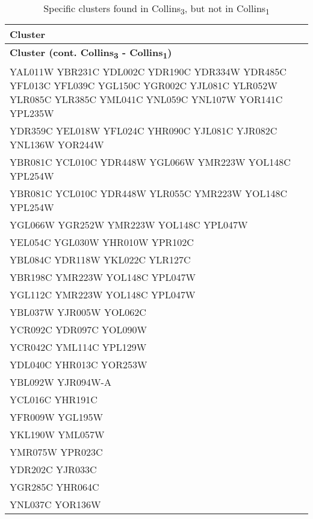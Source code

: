\setlength{\extrarowheight}{2pt}
\renewcommand{\arraystretch}{1.2}
\begin{longtable}{| m{27em} |}
\caption{Specific clusters found in Collins\textsubscript{3}, but not in Collins\textsubscript{1}} \\
\hline
\textbf{Cluster} \\
\hline
\endfirsthead
\hline
\textbf{Cluster (cont. Collins\textsubscript{3} - Collins\textsubscript{1})} \\
\hline
\endhead
\hline
\endfoot
\hline
\endlastfoot
YAL011W YBR231C YDL002C YDR190C YDR334W YDR485C YFL013C YFL039C YGL150C YGR002C YJL081C YLR052W YLR085C YLR385C YML041C YNL059C YNL107W YOR141C YPL235W \\
\hline
YDR359C YEL018W YFL024C YHR090C YJL081C YJR082C YNL136W YOR244W \\
\hline
YBR081C YCL010C YDR448W YGL066W YMR223W YOL148C YPL254W \\
\hline
YBR081C YCL010C YDR448W YLR055C YMR223W YOL148C YPL254W \\
\hline
YGL066W YGR252W YMR223W YOL148C YPL047W \\
\hline
YEL054C YGL030W YHR010W YPR102C \\
\hline
YBL084C YDR118W YKL022C YLR127C \\
\hline
YBR198C YMR223W YOL148C YPL047W \\
\hline
YGL112C YMR223W YOL148C YPL047W \\
\hline
YBL037W YJR005W YOL062C \\
\hline
YCR092C YDR097C YOL090W \\
\hline
YCR042C YML114C YPL129W \\
\hline
YDL040C YHR013C YOR253W \\
\hline
YBL092W YJR094W-A \\
\hline
YCL016C YHR191C \\
\hline
YFR009W YGL195W \\
\hline
YKL190W YML057W \\
\hline
YMR075W YPR023C \\
\hline
YDR202C YJR033C \\
\hline
YGR285C YHR064C \\
\hline
YNL037C YOR136W \\
\hline
\end{longtable}
